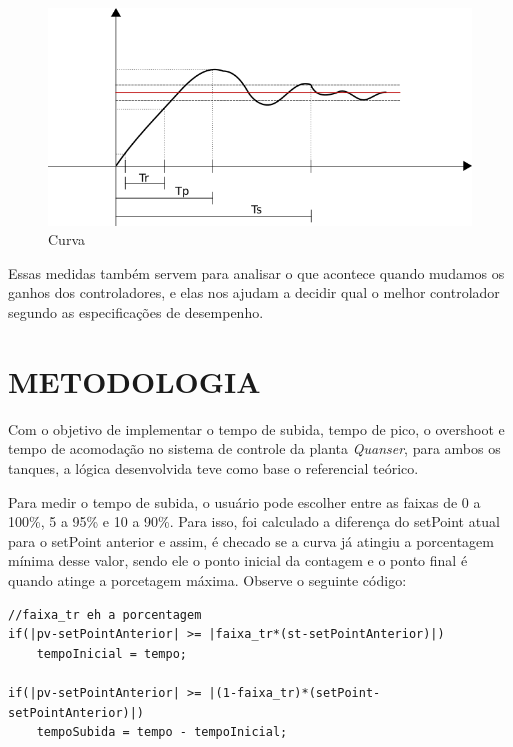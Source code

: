 \documentclass[a4paper,12pt]{article}
\begin{document}
\begin{figure}[H]
\centering
\includegraphics[width=15cm]{fotosLab3/ref.png}
\caption{Curva}
\label{curva}
\end{figure}


\hspace{4ex}Essas medidas também servem para analisar o que acontece quando mudamos os ganhos dos controladores, e elas nos ajudam a decidir qual o melhor controlador segundo as especificações de desempenho.


\newpage


\thispagestyle{main}

\section{METODOLOGIA}
\hspace{4ex}Com o objetivo de implementar o tempo de subida, tempo de pico, o overshoot e tempo de acomodação no sistema de controle da planta \textit{Quanser}, para ambos os tanques, a lógica desenvolvida teve como base o referencial teórico.

\hspace{4ex}Para medir o tempo de subida, o usuário pode escolher entre as faixas de 0 a 100\%, 5 a 95\% e 10 a 90\%. Para isso, foi calculado a diferença do setPoint atual para o setPoint anterior e assim, é checado se a curva já atingiu a porcentagem mínima desse valor, sendo ele o ponto inicial da contagem e o ponto final é quando atinge a porcetagem máxima. Observe o seguinte código:

\begin{lstlisting}
//faixa_tr eh a porcentagem
if(|pv-setPointAnterior| >= |faixa_tr*(st-setPointAnterior)|)
	tempoInicial = tempo;

if(|pv-setPointAnterior| >= |(1-faixa_tr)*(setPoint-setPointAnterior)|)
	tempoSubida = tempo - tempoInicial;
\end{lstlisting}
\end{document}
